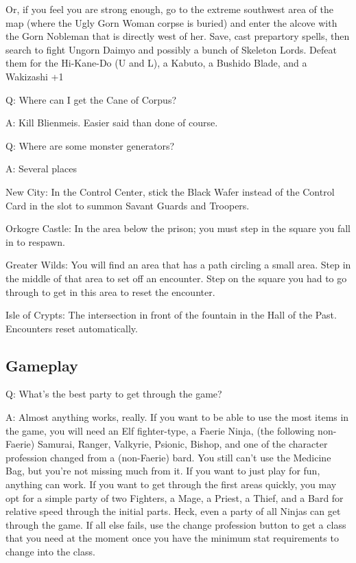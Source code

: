 \documentclass[12pt]{article}
\begin{document}
             Or, if you feel you are strong enough, go to the extreme
             southwest area of the map (where the Ugly Gorn Woman corpse
             is buried) and enter the alcove with the Gorn Nobleman that is
             directly west of her.  Save, cast prepartory spells, then
             search to fight Ungorn Daimyo and possibly a bunch of Skeleton
             Lords.  Defeat them for the Hi-Kane-Do (U and L), a Kabuto, a
             Bushido Blade, and a Wakizashi +1

Q: Where can I get the Cane of Corpus?

A: Kill Blienmeis. Easier said than done of course.

Q: Where are some monster generators?

A: Several places

New City: In the Control Center, stick the Black Wafer instead of the
Control Card in the slot to summon Savant Guards and Troopers.

Orkogre Castle: In the area below the prison; you must step in the
square you fall in to respawn.

Greater Wilds: You will find an area that has a path circling a small
area. Step in the middle of that area to set off an encounter. Step on
the square you had to go through to get in this area to reset the
encounter.

Isle of Crypts: The intersection in front of the fountain in the Hall of
the Past. Encounters reset automatically.

\subsection{Gameplay}\label{gameplay}

Q: What's the best party to get through the game?

A: Almost anything works, really. If you want to be able to use the most
items in the game, you will need an Elf fighter-type, a Faerie Ninja,
(the following non-Faerie) Samurai, Ranger, Valkyrie, Psionic, Bishop,
and one of the character profession changed from a (non-Faerie) bard.
You still can't use the Medicine Bag, but you're not missing much from
it. If you want to just play for fun, anything can work. If you want to
get through the first areas quickly, you may opt for a simple party of
two Fighters, a Mage, a Priest, a Thief, and a Bard for relative speed
through the initial parts. Heck, even a party of all Ninjas can get
through the game. If all else fails, use the change profession button to
get a class that you need at the moment once you have the minimum stat
requirements to change into the class.
\end{document}
